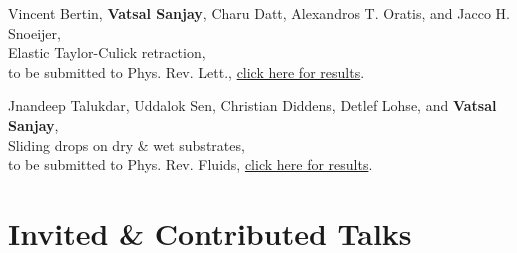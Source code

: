 \documentclass[10pt,a4paper,colorlinks,linkcolor=blue,urlcolor=blue,citecolor=blue]{moderncv}
\begin{document}
\begin{enumerate}[leftmargin=1.5em,label=\textbf{[\arabic*]}]
	\item Vincent Bertin, \textbf{Vatsal Sanjay}, Charu Datt, Alexandros T. Oratis, and Jacco H. Snoeijer,\\
	Elastic Taylor-Culick retraction,\\
	to be submitted to Phys. Rev. Lett., \href{https://tinyurl.com/2cvo89bd}{click here for results}.

	\item Jnandeep Talukdar, Uddalok Sen, Christian Diddens, Detlef Lohse, and \textbf{Vatsal Sanjay},\\
	Sliding drops on dry \& wet substrates,\\
	to be submitted to Phys. Rev. Fluids, \href{https://tinyurl.com/2xvlhlc6}{click here for results}.

\end{enumerate}

\section{Invited \& Contributed Talks}
\end{document}
